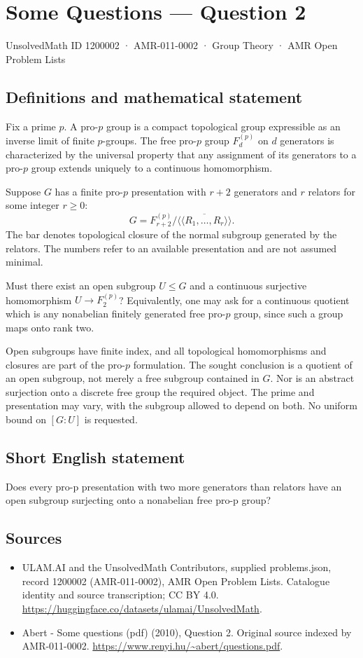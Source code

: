 \documentclass[11pt,a4paper]{article}
\begin{document}
\section*{Some Questions — Question 2}\label{1200002}
{\small UnsolvedMath ID 1200002 · AMR-011-0002 · Group Theory · AMR Open Problem Lists}
\subsection{Definitions and mathematical statement}
Fix a prime $p$. A pro-$p$ group is a compact topological group expressible as an inverse limit of finite $p$-groups. The free pro-$p$ group $F_d^{(p)}$ on $d$ generators is characterized by the universal property that any assignment of its generators to a pro-$p$ group extends uniquely to a continuous homomorphism.

Suppose $G$ has a finite pro-$p$ presentation with $r+2$ generators and $r$ relators for some integer $r\geq0$:
\[
 G=F_{r+2}^{(p)}/\overline{\langle\!\langle R_1,\ldots,R_r
                            \rangle\!\rangle}.
\]
The bar denotes topological closure of the normal subgroup generated by the relators. The numbers refer to an available presentation and are not assumed minimal.

Must there exist an open subgroup $U\leq G$ and a continuous surjective homomorphism $U\to F_2^{(p)}$? Equivalently, one may ask for a continuous quotient which is any nonabelian finitely generated free pro-$p$ group, since such a group maps onto rank two.

Open subgroups have finite index, and all topological homomorphisms and closures are part of the pro-$p$ formulation. The sought conclusion is a quotient of an open subgroup, not merely a free subgroup contained in $G$. Nor is an abstract surjection onto a discrete free group the required object. The prime and presentation may vary, with the subgroup allowed to depend on both. No uniform bound on $[G:U]$ is requested.
\subsection{Short English statement}
Does every pro-p presentation with two more generators than relators have an open subgroup surjecting onto a nonabelian free pro-p group?
\subsection{Sources}
\begin{itemize}
\item[S1] ULAM.AI and the UnsolvedMath Contributors, supplied problems.json, record 1200002 (AMR-011-0002), AMR Open Problem Lists. Catalogue identity and source transcription; CC BY 4.0.
\url{https://huggingface.co/datasets/ulamai/UnsolvedMath}.
\item[S2] Abert - Some questions (pdf) (2010), Question 2. Original source indexed by AMR-011-0002.
\url{https://www.renyi.hu/~abert/questions.pdf}.
\end{itemize}
\end{document}

